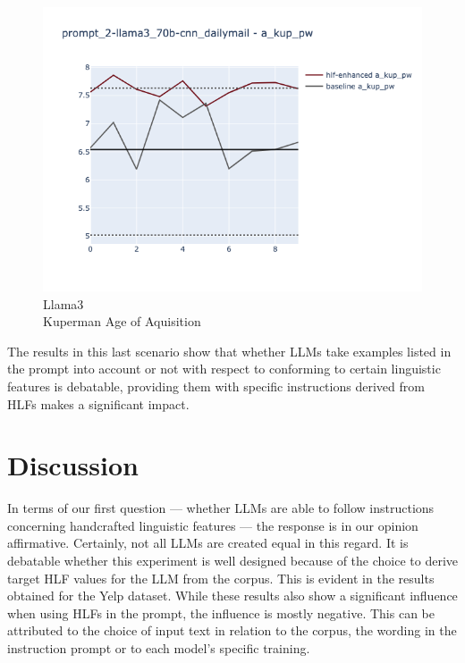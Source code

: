 \documentclass[runningheads,a4paper,11pt]{article}
\begin{document}
\begin{figure}[ht!]
\begin{minipage}{0.32\textwidth}
        \label{fig-p2-ifd-gemini-twords}
    \end{minipage}
    \hfill
    \begin{minipage}{0.32\textwidth}
        \includegraphics[width=\linewidth]{plots/prompt_2_ifd/prompt_2-llama3_70b-cnn_dailymail/prompt_2-llama3_70b-cnn_dailymail_a_kup_pw.png}
        \caption[center]{Llama3\\Kuperman Age of Aquisition}
        \label{fig-p2-ifd-llama3-a-kup-pw}
    \end{minipage}
\end{figure}

The results in this last scenario show that whether LLMs take examples listed in
the prompt into account or not with respect to conforming to certain linguistic
features is debatable, providing them with specific instructions derived from
HLFs makes a significant impact.

\section{Discussion}

In terms of our first question --- whether LLMs are able to follow instructions
concerning handcrafted linguistic features --- the response is in our opinion
affirmative.
Certainly, not all LLMs are created equal in this regard.
It is debatable whether this experiment is well designed because of the choice
to derive target HLF values for the LLM from the corpus.
This is evident in the results obtained for the Yelp dataset.
While these results also show a significant influence when using HLFs in the
prompt, the influence is mostly negative.
This can be attributed to the choice of input text in relation to the corpus,
the wording in the instruction prompt or to each model's specific training.
\end{document}
